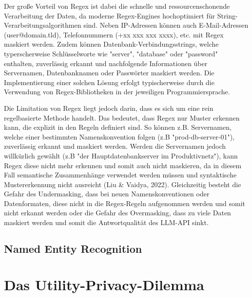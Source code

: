 Der große Vorteil von Regex ist dabei die schnelle und ressourcenschonende Verarbeitung der Daten, da moderne Regex-Engines hochoptimiert
für String-Verarbeitungsalgorithmen sind. Neben IP-Adressen können auch E-Mail-Adressen (user@domain.tld), Telefonnummern (+xx xxx xxx xxxx), etc. mit Regex maskiert werden.
Zudem können Datenbank-Verbindungsstrings, welche typerscherweise Schlüsselworte wie "server", "database" oder "password" enthalten, zuverlässig erkannt und nachfolgende
Informationen über Servernamen, Datenbanknamen oder Passwörter maskiert werden.
Die Implementierung einer solchen Lösung erfolgt typischerweise durch die Verwendung von Regex-Bibliotheken in der jeweiligen Programmiersprache.

Die Limitation von Regex liegt jedoch darin, dass es sich um eine rein regelbasierte Methode handelt. Das bedeutet, dass Regex nur Muster erkennen kann, die explizit in den Regeln definiert sind.
So können z.B. Servernamen, welche einer bestimmten Namenskonvention folgen (z.B "prod-db-server-01"), zuverlässig erkannt und maskiert werden.
Werden die Servernamen jedoch willkürlich gewählt (z.B "der Hauptdatenbankserver im Produktivnetz"), kann Regex diese nicht mehr erkennen und somit auch nicht maskieren,
da in diesem Fall semantische Zusammenhänge verwendet werden müssen und syntaktische Mustererkennung nicht ausreicht (Liu & Vaidya, 2022).
Gleichzeitig besteht die Gefahr des Undermasking, dass bei neuen Namenskonventionen oder Datenformaten, diese nicht in die Regex-Regeln aufgenommen werden und somit nicht erkannt werden
oder die Gefahr des Overmasking, dass zu viele Daten maskiert werden und somit die Antwortqualität des LLM-API sinkt.



\subsection{Named Entity Recognition}

\section{Das Utility-Privacy-Dilemma}
